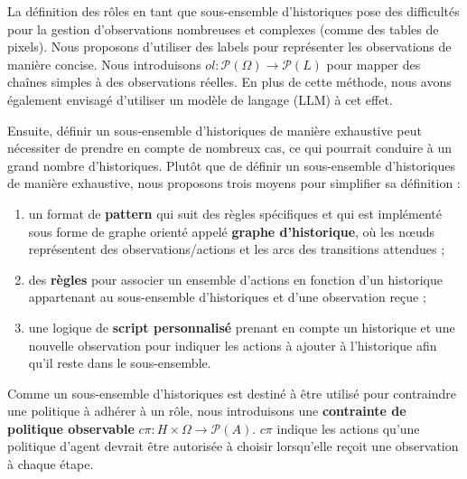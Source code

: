 \documentclass[sigconf,anonymous]{aamas}
\begin{document}
La définition des rôles en tant que sous-ensemble d'historiques pose des difficultés pour la gestion d'observations nombreuses et complexes (comme des tables de pixels). Nous proposons d'utiliser des labels pour représenter les observations de manière concise. Nous introduisons $ol: \mathcal{P}(\Omega) \rightarrow \mathcal{P}(L)$ pour mapper des chaînes simples à des observations réelles. En plus de cette méthode, nous avons également envisagé d'utiliser un modèle de langage (LLM) à cet effet.

Ensuite, définir un sous-ensemble d'historiques de manière exhaustive peut nécessiter de prendre en compte de nombreux cas, ce qui pourrait conduire à un grand nombre d'historiques. Plutôt que de définir un sous-ensemble d'historiques de manière exhaustive, nous proposons trois moyens pour simplifier sa définition :
\begin{enumerate}
    \item un format de \textbf{pattern} qui suit des règles spécifiques et qui est implémenté sous forme de graphe orienté appelé \textbf{graphe d'historique}, où les nœuds représentent des observations/actions et les arcs des transitions attendues ;
    \item des \textbf{règles} pour associer un ensemble d'actions en fonction d'un historique appartenant au sous-ensemble d'historiques et d'une observation reçue ;
    \item une logique de \textbf{script personnalisé} prenant en compte un historique et une nouvelle observation pour indiquer les actions à ajouter à l'historique afin qu'il reste dans le sous-ensemble.
\end{enumerate}

Comme un sous-ensemble d'historiques est destiné à être utilisé pour contraindre une politique à adhérer à un rôle, nous introduisons une \textbf{contrainte de politique observable} $c\pi: H \times \Omega \rightarrow \mathcal{P}(A)$. $c\pi$ indique les actions qu'une politique d'agent devrait être autorisée à choisir lorsqu'elle reçoit une observation à chaque étape.
\end{document}
